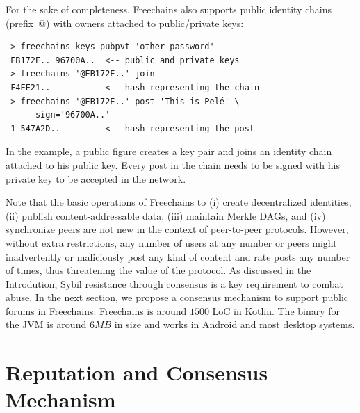 \documentclass[12pt]{article}
\newcommand{\FC}       {Freechains\xspace}
\begin{document}
For the sake of completeness, \FC also supports public identity chains
(prefix~$@$) with owners attached to public/private keys:

{\footnotesize
\begin{verbatim}
 > freechains keys pubpvt 'other-password'
 EB172E.. 96700A..  <-- public and private keys
 > freechains '@EB172E..' join
 F4EE21..           <-- hash representing the chain
 > freechains '@EB172E..' post 'This is Pelé' \
    --sign='96700A..'
 1_547A2D..         <-- hash representing the post
\end{verbatim}
}

In the example, a public figure creates a key pair and joins an identity chain
attached to his public key.
Every post in the chain needs to be signed with his private key to be accepted
in the network.

Note that the basic operations of Freechains to (i) create decentralized
identities, (ii) publish content-addressable data, (iii) maintain Merkle DAGs,
and (iv) synchronize peers are not new in the context of peer-to-peer
protocols.
%
However, without extra restrictions, any number of users at any number or peers
might inadvertently or maliciously post any kind of content and rate posts any
number of times, thus threatening the value of the protocol.
%
As discussed in the Introdution, Sybil resistance through consensus is a key
requirement to combat abuse.
%
In the next section, we propose a consensus mechanism to support public forums
in \FC.
%
\FC is around $1500$ LoC in Kotlin. %
The binary for the JVM is around $6MB$ in size and works in Android and most
desktop systems.


\section{Reputation and Consensus Mechanism}
\label{sec.consensus}
\end{document}
